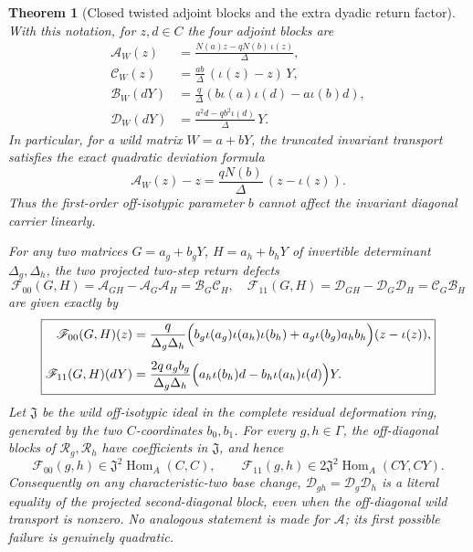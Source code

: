 \documentclass[11pt]{article}
\newtheorem{theorem}{Theorem}[section]
\theoremstyle{definition}
\begin{document}
\begin{theorem}[Closed twisted adjoint blocks and the extra dyadic return factor]
\label{thm:dyadic-f132-adjoint-return-parity}
With this notation, for $z,d\in C$
the four adjoint blocks are
\begin{equation}\label{eq:dyadic-f132-adjoint-four-blocks}
\boxed{
\begin{aligned}
\mathcal A_W(z)
&=\frac{N(a)z-qN(b)\,\iota(z)}{\Delta},\\
\mathcal C_W(z)
&=\frac{ab}{\Delta}\,(\iota(z)-z)\,Y,\\
\mathcal B_W(dY)
&=\frac{q}{\Delta}
\left(b\iota(a)\iota(d)
       -a\iota(b)d\right),\\
\mathcal D_W(dY)
&=\frac{a^2d-qb^2\iota(d)}{\Delta}\,Y.
\end{aligned}}
\end{equation}
In particular, for a wild
matrix $W=a+bY$, the
truncated invariant transport
satisfies the \emph{exact}
quadratic deviation formula
\begin{equation}\label{eq:dyadic-f132-invariant-diagonal-drift}
\boxed{\qquad
\mathcal A_W(z)-z
=\frac{qN(b)}{\Delta}\,
(z-\iota(z)).
\qquad}
\end{equation}
Thus the first-order
off-isotypic parameter $b$
cannot affect the invariant
diagonal carrier linearly.

For any two matrices
$G=a_g+b_gY$, $H=a_h+b_hY$
of invertible determinant
$\Delta_g,\Delta_h$,
the two projected
two-step return defects
\[
\mathscr F_{00}(G,H)
=\mathcal A_{GH}
  -\mathcal A_G\mathcal A_H
=\mathcal B_G\mathcal C_H,
\quad
\mathscr F_{11}(G,H)
=\mathcal D_{GH}
  -\mathcal D_G\mathcal D_H
=\mathcal C_G\mathcal B_H
\]
are given \emph{exactly} by
\begin{equation}\label{eq:dyadic-f132-return-zero}
\boxed{
\begin{aligned}
\mathscr F_{00}(G,H)(z)
={}&\frac{q}{\Delta_g\Delta_h}
\Bigl(
 b_g\iota(a_g)\iota(a_h)\iota(b_h)
 +a_g\iota(b_g)a_hb_h
\Bigr)(z-\iota(z)),
\\[4pt]
\mathscr F_{11}(G,H)(dY)
={}&\frac{2q\,a_gb_g}
{\Delta_g\Delta_h}
\Bigl(
a_h\iota(b_h)d-
b_h\iota(a_h)\iota(d)
\Bigr)Y.
\end{aligned}}
\end{equation}
Let $\mathfrak J$ be the wild
off-isotypic ideal in the
complete residual deformation
ring, generated by the two
$C$-coordinates $b_0,b_1$.
For every $g,h\in\Gamma$,
the off-diagonal blocks of
$\mathcal R_g,\mathcal R_h$
have coefficients in
$\mathfrak J$, and hence
\begin{equation}\label{eq:dyadic-f132-return-filtration}
\boxed{\quad
\mathscr F_{00}(g,h)\in
\mathfrak J^2
\operatorname{Hom}_A(C,C),
\qquad
\mathscr F_{11}(g,h)\in
2\mathfrak J^2
\operatorname{Hom}_A(CY,CY).
\quad}
\end{equation}
Consequently on \emph{any}
characteristic-two base
change, $\mathcal D_{gh}
=\mathcal D_g\mathcal D_h$
is a literal equality of
the projected second-diagonal
block, even when the
off-diagonal wild transport
is nonzero.
No analogous statement
is made for $\mathcal A$;
its first possible failure
is genuinely quadratic.
\end{theorem}
\end{document}
